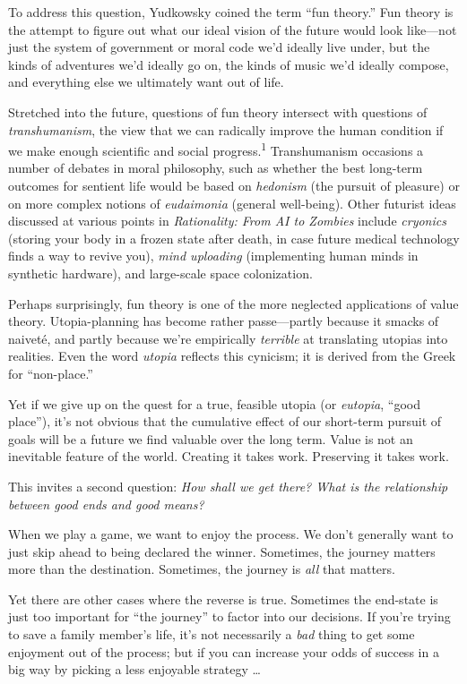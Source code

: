 {
 To address this question, Yudkowsky coined the term
``fun theory.'' Fun theory is the
attempt to figure out what our ideal vision of the future would look
like---not just the system of government or moral code
we'd ideally live under, but the kinds of adventures
we'd ideally go on, the kinds of music
we'd ideally compose, and everything else we ultimately
want out of life.}

{
 Stretched into the future, questions of fun theory intersect with
questions of \textit{transhumanism}, the view that we can radically
improve the human condition if we make enough scientific and social
progress.\textsuperscript{1} Transhumanism occasions a number of
debates in moral philosophy, such as whether the best long-term
outcomes for sentient life would be based on \textit{hedonism} (the
pursuit of pleasure) or on more complex notions of \textit{eudaimonia}
(general well-being). Other futurist ideas discussed at various points
in \textit{Rationality: From AI to Zombies} include \textit{cryonics}
(storing your body in a frozen state after death, in case future
medical technology finds a way to revive you), \textit{mind uploading}
(implementing human minds in synthetic hardware), and large-scale space
colonization.}

{
 Perhaps surprisingly, fun theory is one of the more neglected
applications of value theory. Utopia-planning has become rather
passe---partly because it smacks of naiveté, and partly because
we're empirically \textit{terrible} at translating
utopias into realities. Even the word \textit{utopia} reflects this
cynicism; it is derived from the Greek for
``non-place.''}

{
 Yet if we give up on the quest for a true, feasible utopia (or
\textit{eutopia}, ``good place''),
it's not obvious that the cumulative effect of our
short-term pursuit of goals will be a future we find valuable over the
long term. Value is not an inevitable feature of the world. Creating it
takes work. Preserving it takes work.}

{
 This invites a second question: \textit{How shall we get there?
What is the relationship between good ends and good means?}}

{
 When we play a game, we want to enjoy the process. We
don't generally want to just skip ahead to being
declared the winner. Sometimes, the journey matters more than the
destination. Sometimes, the journey is \textit{all} that matters.}

{
 Yet there are other cases where the reverse is true. Sometimes the
end-state is just too important for ``the
journey'' to factor into our decisions. If
you're trying to save a family member's
life, it's not necessarily a \textit{bad} thing to get
some enjoyment out of the process; but if you can increase your odds of
success in a big way by picking a less enjoyable strategy \ldots}

